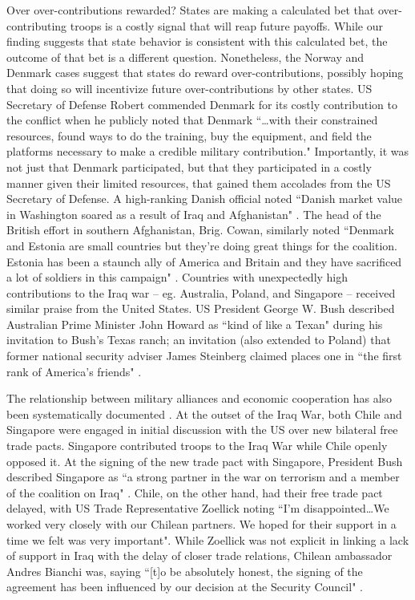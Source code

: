 \documentclass[12pt,letterpaper]{article}
\begin{document}
	Over over-contributions rewarded? States are making a calculated bet that over-contributing troops is a costly signal that will reap future payoffs. While our finding suggests that state behavior is consistent with this calculated bet, the outcome of that bet is a different question. Nonetheless, the Norway and Denmark cases suggest that states do reward over-contributions, possibly hoping that doing so will incentivize future over-contributions by other states. US Secretary of Defense Robert \citet{gates_securitydefenseagenda_2011} commended Denmark for its costly contribution to the conflict when he publicly noted that Denmark ``\ldots with their constrained resources, found ways to do the training, buy the equipment, and field the platforms necessary to make a credible military contribution." Importantly, it was not just that Denmark participated, but that they participated in a costly manner given their limited resources, that gained them accolades from the US Secretary of Defense. A high-ranking Danish official noted ``Danish market value in Washington soared as a result of Iraq and Afghanistan" \citep{henriksen_whatdiddenmark_2012}. The head of the British effort in southern Afghanistan, Brig. Cowan, similarly noted ``Denmark and Estonia are small countries but they're doing great things for the coalition. Estonia has been a staunch ally of America and Britain and they have sacrificed a lot of soldiers in this campaign" \citep{druzin_tinyestoniakeen_2009}. Countries with unexpectedly high contributions to the Iraq war -- eg. Australia, Poland, and Singapore -- received similar praise from the United States. US President George W. Bush described Australian Prime Minister John Howard as ``kind of like a Texan" during his invitation to Bush's Texas ranch; an invitation (also extended to Poland) that former national security adviser James Steinberg claimed places one in ``the first rank of America's friends" \citep{sanger_meanwhilebackranch_2003}.
	
	The relationship between military alliances and economic cooperation has also been systematically documented \citep{long_tradingsecuritymilitary_2006}. At the outset of the Iraq War, both Chile and Singapore were engaged in initial discussion with the US over new bilateral free trade pacts. Singapore contributed troops to the Iraq War while Chile openly opposed it. At the signing of the new trade pact with Singapore, President Bush described Singapore as ``a strong partner in the war on terrorism and a member of the coalition on Iraq" \citep{armstrong_alliesrewardedtrade_2003}. Chile, on the other hand, had their free trade pact delayed, with US Trade Representative Zoellick noting ``I'm disappointed\ldots We worked very closely with our Chilean partners. We hoped for their support in a time we felt was very important". While Zoellick was not explicit in linking a lack of support in Iraq with the delay of closer trade relations, Chilean ambassador Andres Bianchi was, saying ``[t]o be absolutely honest, the signing of the agreement has been influenced by our decision at the Security Council" \citep{armstrong_alliesrewardedtrade_2003}.
\end{document}
